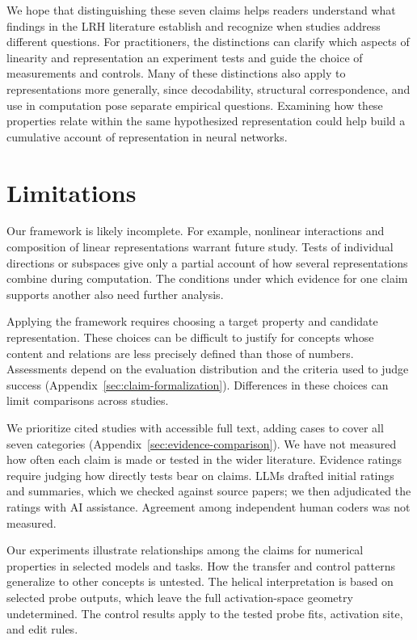\documentclass[11pt]{article}
\begin{document}
We hope that distinguishing these seven claims helps readers understand what findings in the LRH literature establish and recognize when studies address different questions.
For practitioners, the distinctions can clarify which aspects of linearity and representation an experiment tests and guide the choice of measurements and controls.
Many of these distinctions also apply to representations more generally, since decodability, structural correspondence, and use in computation pose separate empirical questions.
Examining how these properties relate within the same hypothesized representation could help build a cumulative account of representation in neural networks.

\section*{Limitations}

Our framework is likely incomplete.
For example, nonlinear interactions and composition of linear representations warrant future study.
Tests of individual directions or subspaces give only a partial account of how several representations combine during computation.
The conditions under which evidence for one claim supports another also need further analysis.

Applying the framework requires choosing a target property and candidate representation.
These choices can be difficult to justify for concepts whose content and relations are less precisely defined than those of numbers.
Assessments depend on the evaluation distribution and the criteria used to judge success (Appendix~\ref{sec:claim-formalization}).
Differences in these choices can limit comparisons across studies.

We prioritize cited studies with accessible full text, adding cases to cover all seven categories (Appendix~\ref{sec:evidence-comparison}).
We have not measured how often each claim is made or tested in the wider literature.
Evidence ratings require judging how directly tests bear on claims.
LLMs drafted initial ratings and summaries, which we checked against source papers; we then adjudicated the ratings with AI assistance.
Agreement among independent human coders was not measured.

Our experiments illustrate relationships among the claims for numerical properties in selected models and tasks.
How the transfer and control patterns generalize to other concepts is untested.
The helical interpretation is based on selected probe outputs, which leave the full activation-space geometry undetermined.
The control results apply to the tested probe fits, activation site, and edit rules.
\end{document}
